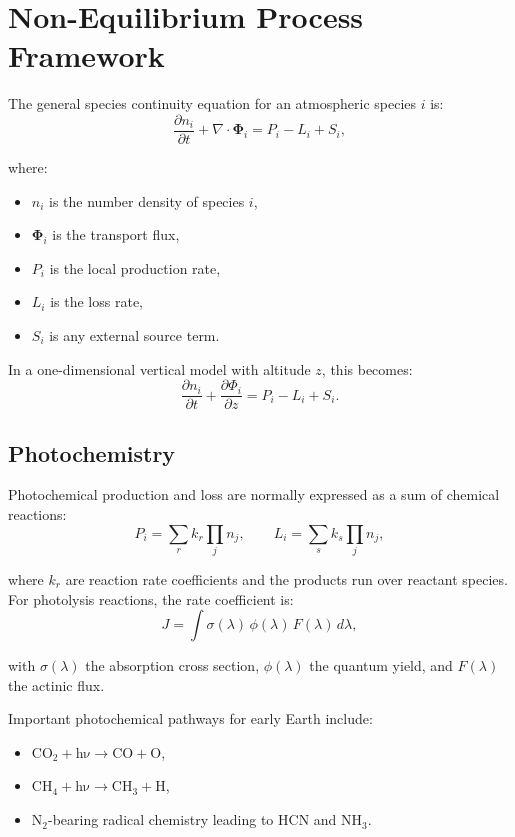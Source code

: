\documentclass[11pt]{article}
\begin{document}
\section{Non-Equilibrium Process Framework}

The general species continuity equation for an atmospheric species $i$ is:
\begin{equation}
\frac{\partial n_i}{\partial t} + \nabla \cdot \mathbf{\Phi}_i = P_i - L_i + S_i,
\label{eq:continuity}
\end{equation}

where:
\begin{itemize}
  \item $n_i$ is the number density of species $i$,
  \item $\mathbf{\Phi}_i$ is the transport flux,
  \item $P_i$ is the local production rate,
  \item $L_i$ is the loss rate,
  \item $S_i$ is any external source term.
\end{itemize}

In a one-dimensional vertical model with altitude $z$, this becomes:
\begin{equation}
\frac{\partial n_i}{\partial t} + \frac{\partial \Phi_i}{\partial z} = P_i - L_i + S_i.\label{eq:1d}
\end{equation}

\subsection{Photochemistry}

Photochemical production and loss are normally expressed as a sum of chemical reactions:
\begin{equation}
P_i = \sum_r k_r \prod_j n_j, \qquad L_i = \sum_s k_s \prod_j n_j,
\end{equation}

where $k_r$ are reaction rate coefficients and the products run over reactant species. For photolysis reactions, the rate coefficient is:
\begin{equation}
J = \int \sigma(\lambda) \, \phi(\lambda) \, F(\lambda) \, d\lambda,
\end{equation}

with $\sigma(\lambda)$ the absorption cross section, $\phi(\lambda)$ the quantum yield, and $F(\lambda)$ the actinic flux.

Important photochemical pathways for early Earth include:
\begin{itemize}
  \item $\mathrm{CO_2 + h\nu \rightarrow CO + O}$,
  \item $\mathrm{CH_4 + h\nu \rightarrow CH_3 + H}$,
  \item $\mathrm{N_2}$-bearing radical chemistry leading to $\mathrm{HCN}$ and $\mathrm{NH_3}$.
\end{itemize}
\end{document}

